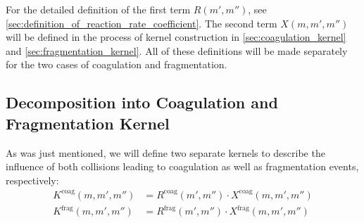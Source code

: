     
        For the detailed definition of the first term $R(m', m'')$, 
        see \cref{sec:definition_of_reaction_rate_coefficient}. The second term $X(m, m', m'')$
        will be defined in the process of kernel construction in 
        \cref{sec:coagulation_kernel} and \cref{sec:fragmentation_kernel}.
        All of these definitions will be made separately for the two cases of coagulation and
        fragmentation. 
    


    \subsection{Decomposition into Coagulation and Fragmentation Kernel}

        As was just mentioned, we will define two separate kernels to describe the influence 
        of both collisions leading to coagulation as well as fragmentation events, respectively:
        \begin{align}
            K^\text{coag}(m,m',m'') &= R^\text{coag}(m',m'') \cdot X^\text{coag}(m,m',m'') \\
            K^\text{frag}(m,m',m'') &= R^\text{frag}(m',m'') \cdot X^\text{frag}(m,m',m'')
        \end{align}

